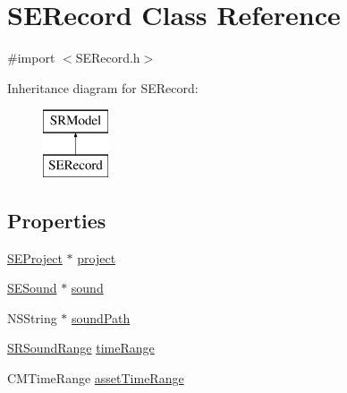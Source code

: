 \hypertarget{interface_s_e_record}{\section{S\-E\-Record Class Reference}
\label{interface_s_e_record}
}


{\ttfamily \#import $<$S\-E\-Record.\-h$>$}

Inheritance diagram for S\-E\-Record\-:\begin{figure}[H]
\begin{center}
\leavevmode
\includegraphics[height=2.000000cm]{interface_s_e_record}
\end{center}
\end{figure}
\subsection*{Properties}
\begin{DoxyCompactItemize}
\item 
\hyperlink{interface_s_e_project}{S\-E\-Project} $\ast$ \hyperlink{interface_s_e_record_a6051966cb1a3a4f0dcf0e3963fc9d129}{project}
\item 
\hyperlink{interface_s_e_sound}{S\-E\-Sound} $\ast$ \hyperlink{interface_s_e_record_a5fe4fce40492a08dafb34f659ff35ceb}{sound}
\item 
N\-S\-String $\ast$ \hyperlink{interface_s_e_record_aaf616132fe7f963e0c791e00b12e6f92}{sound\-Path}
\item 
\hyperlink{struct_s_r_sound_range}{S\-R\-Sound\-Range} \hyperlink{interface_s_e_record_ac529abfcc62ecfb7123a8ecae4431822}{time\-Range}
\item 
C\-M\-Time\-Range \hyperlink{interface_s_e_record_ad11719c2813141c0a4fc23da025382f0}{asset\-Time\-Range}
\end{DoxyCompactItemize}


